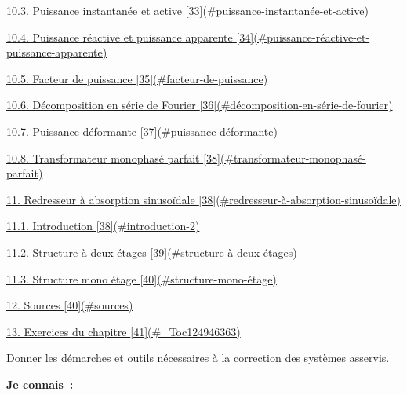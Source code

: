\protect\hyperlink{puissance-instantanuxe9e-et-active}{10.3. Puissance instantanée et active {[}33{]}(\#puissance-instantanée-et-active)}

\protect\hyperlink{puissance-ruxe9active-et-puissance-apparente}{10.4. Puissance réactive et puissance apparente {[}34{]}(\#puissance-réactive-et-puissance-apparente)}

\protect\hyperlink{facteur-de-puissance}{10.5. Facteur de puissance {[}35{]}(\#facteur-de-puissance)}

\protect\hyperlink{duxe9composition-en-suxe9rie-de-fourier}{10.6. Décomposition en série de Fourier {[}36{]}(\#décomposition-en-série-de-fourier)}

\protect\hyperlink{puissance-duxe9formante}{10.7. Puissance déformante {[}37{]}(\#puissance-déformante)}

\protect\hyperlink{transformateur-monophasuxe9-parfait}{10.8. Transformateur monophasé parfait {[}38{]}(\#transformateur-monophasé-parfait)}

\protect\hyperlink{redresseur-uxe0-absorption-sinusouxefdale}{11. Redresseur à absorption sinusoïdale {[}38{]}(\#redresseur-à-absorption-sinusoïdale)}

\protect\hyperlink{introduction-2}{11.1. Introduction {[}38{]}(\#introduction-2)}

\protect\hyperlink{structure-uxe0-deux-uxe9tages}{11.2. Structure à deux étages {[}39{]}(\#structure-à-deux-étages)}

\protect\hyperlink{structure-mono-uxe9tage}{11.3. Structure mono étage {[}40{]}(\#structure-mono-étage)}

\protect\hyperlink{sources}{12. Sources {[}40{]}(\#sources)}

\protect\hyperlink{_Toc124946363}{13. Exercices du chapitre {[}41{]}(\#\_Toc124946363)}

Donner les démarches et outils nécessaires à la correction des systèmes asservis.

\textbf{Je connais~:}

